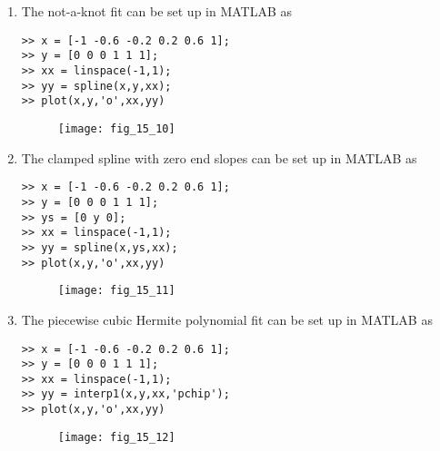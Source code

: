 \documentclass[../main.tex]{subfiles}
\begin{document}
\section{}
\begin{enumerate}[label=\bfseries(\alph*)]
\item The not-a-knot fit can be set up in MATLAB as
	\bigbreak
\begin{lstlisting}[numbers=none]
>> x = [-1 -0.6 -0.2 0.2 0.6 1];
>> y = [0 0 0 1 1 1];
>> xx = linspace(-1,1);
>> yy = spline(x,y,xx);
>> plot(x,y,'o',xx,yy) 
\end{lstlisting}
	\bigbreak
	\begin{figure}[H]
		\texttt{[image: fig\_15\_10]}
		\label{fig:fig_15_10}
	\end{figure}
	\bigbreak
\item The clamped spline with zero end slopes can be set up in MATLAB as
	\bigbreak
\begin{lstlisting}[numbers=none]
>> x = [-1 -0.6 -0.2 0.2 0.6 1];
>> y = [0 0 0 1 1 1];
>> ys = [0 y 0];
>> xx = linspace(-1,1);
>> yy = spline(x,ys,xx);
>> plot(x,y,'o',xx,yy) 
\end{lstlisting}
	\bigbreak
	\begin{figure}[H]
		\texttt{[image: fig\_15\_11]}
		\label{fig:fig_15_11}
	\end{figure}
	\bigbreak
\item The piecewise cubic Hermite polynomial fit can be set up in MATLAB as
	\bigbreak
\begin{lstlisting}[numbers=none]
>> x = [-1 -0.6 -0.2 0.2 0.6 1];
>> y = [0 0 0 1 1 1];
>> xx = linspace(-1,1);
>> yy = interp1(x,y,xx,'pchip');
>> plot(x,y,'o',xx,yy) 
\end{lstlisting}
	\bigbreak
	\begin{figure}[H]
		\texttt{[image: fig\_15\_12]}
		\label{fig:fig_15_12}
	\end{figure}
	\bigbreak
\end{enumerate}
\end{document}
